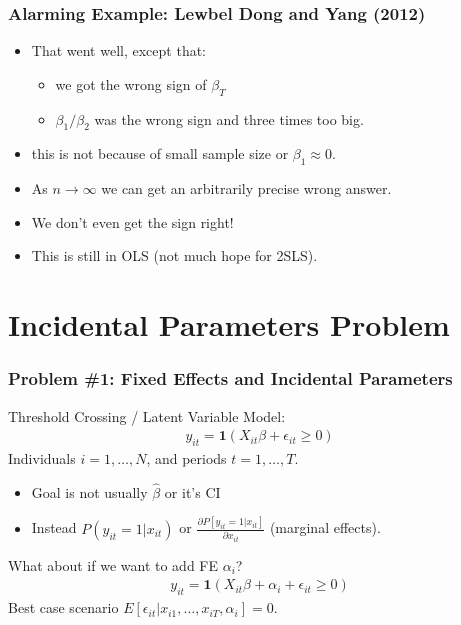 \documentclass[xcolor=pdftex,dvipsnames,table,mathserif,aspectratio=169]{beamer}
\begin{document}
\begin{frame}[fragile]
\frametitle{Alarming Example: Lewbel Dong and Yang (2012)}
\begin{itemize}
\item That went well, except that:
\begin{itemize}
\item we got the wrong sign of $\beta_T$
\item $\beta_1/\beta_2$ was the wrong sign and three times too big.
\end{itemize}
\item this is not because of small sample size or $\beta_1 \approx 0$.
\item As $n \rightarrow \infty$ we can get an arbitrarily precise wrong answer.
\item We don't even get the sign right!
\item This is still in OLS (not much hope for 2SLS).
\end{itemize}
\tiny

\end{frame}


\section*{Incidental Parameters Problem}

\begin{frame}
\frametitle{Problem \#1: Fixed Effects and Incidental Parameters}
Threshold Crossing / Latent Variable Model:
\begin{eqnarray*}
y_{it} = \mathbf{1}(X_{it} \beta + \epsilon_{it} \geq 0)
\end{eqnarray*}
Individuals $i=1,\ldots,N$, and periods $t=1,\ldots,T$.
\begin{itemize}
\item  Goal is not usually $\hat{\beta}$ or it's CI
\item Instead  $P(y_{it}=1 | x_{it})$ or $\frac{\partial P[y_{it}=1 | x_{it}] }{\partial x_{it}}$ (marginal effects).
\end{itemize}
What about if we want to add FE $\alpha_i$?
\begin{eqnarray*}
y_{it} = \mathbf{1}(X_{it} \beta +\alpha_i+ \epsilon_{it} \geq 0)
\end{eqnarray*}
Best case scenario $E[\epsilon_{it} | x_{i1} ,\ldots, x_{iT}, \alpha_i]=0$.
\end{frame}
\end{document}
